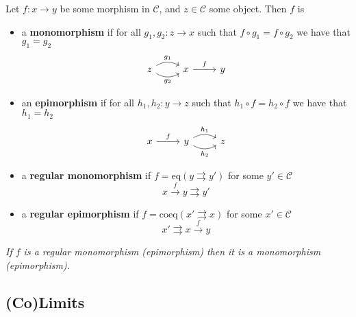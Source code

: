 \documentclass[10pt]{article}
\newcommand{\ccat}{\mathcal{C}}
\newcommand{\eq}{\mathrm{eq}}
\newcommand{\coeq}{\mathrm{coeq}}
\begin{document}
            Let $f\colon x\to y$ be some morphism in $\ccat$, and $z\in\ccat$ some object.
            Then $f$ is
            \begin{itemize}
                \item a \textbf{monomorphism} if for all $g_1,g_2\colon z\to x$ such that $f\circ g_1=f\circ g_2$ we have that $g_1=g_2$
                    \begin{equation*}
                        \begin{tikzcd}
                            z \ar[bend left=30]{r}{g_1} \ar[bend right=30]{r}[swap]{g_2}
                            & x \rar{f}
                            & y
                        \end{tikzcd}
                    \end{equation*}
                \item an \textbf{epimorphism} if for all $h_1,h_2\colon y\to z$ such that $h_1\circ f=h_2\circ f$ we have that $h_1=h_2$
                    \begin{equation*}
                        \begin{tikzcd}
                            x \rar{f}
                            & y \ar[bend left=30]{r}{h_1} \ar[bend right=30]{r}[swap]{h_2}
                            & z
                        \end{tikzcd}
                    \end{equation*}
                \item a \textbf{regular monomorphism} if $f=\eq(y\rightrightarrows y')$ for some $y'\in\ccat$
                    \begin{equation*}
                        x\xrightarrow{f}y\rightrightarrows y'
                    \end{equation*}
                \item a \textbf{regular epimorphism} if $f=\coeq(x'\rightrightarrows x)$ for some $x'\in\ccat$
                    \begin{equation*}
                        x'\rightrightarrows x\xrightarrow{f}y
                    \end{equation*}
            \end{itemize}

            \emph{If $f$ is a regular monomorphism (epimorphism) then it is a monomorphism (epimorphism).}

        \subsection{(Co)Limits}
\end{document}
